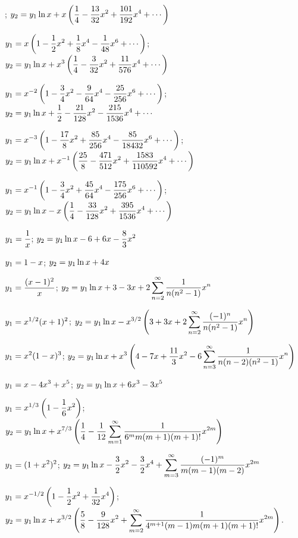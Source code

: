 \quad;\;  \;\;\;
$\displaystyle{y_{2}=y_{1}\ln
x+x\left(\frac{1}{4}-\frac{13}{32}x^{2}+\frac{101}{192}x^{4}
+\cdots\right)}$

$\displaystyle{y_{1}=x\left(1-\frac{1}{2}x^{2}+\frac{1}{8}x^{4}-\frac{1}{48}x^{6}+\cdots\right)}$;\;
$\displaystyle{y_{2}=y_{1}\ln x+x^{3}\left(\frac{1}{4}-\frac{3}{32}x^{2}+
\frac{11}{576}x^{4}+\cdots\right)}$

$\displaystyle{y_{1}=x^{-2}\left(1-\frac{3}{4}x^{2}-\frac{9}{64}x^{4}-\frac{25}{256}x^{6}
+\cdots\right)}$;\;
$\displaystyle{y_{2}=y_{1}\ln x+\frac{1}{2}-\frac{21}{128}x^{2}-\frac{215}{1536}x^{4}+\cdots}$

$\displaystyle{y_{1}=x^{-3}\left(1-\frac{17}{8}x^{2}+\frac{85}{256}x^{4}-\frac{85}{18432}x^{6}+\cdots\right)}$;\;
$\displaystyle{y_{2}=y_{1}\ln x
+x^{-1}\left(\frac{25}{8}-\frac{471}{512}x^{2}+\frac{1583}{110592}x^{4}
+\cdots\right)}$

$\displaystyle{y_{1}=x^{-1}\left(1-\frac{3}{4}x^{2}+\frac{45}{64}x^{4}-\frac{175}{256}x^{6}+\cdots
\right)}$;\;
$\displaystyle{y_{2}=y_{1}\ln x-x\left(\frac{1}{4}-\frac{33}{128}x^{2}+\frac{395}{1536}x^{4}
+\cdots\right)}$

$\displaystyle{y_{1}=\frac{1}{x}}$;\;   $\displaystyle{y_{2}=y_{1}\ln x-6+6x-\frac{8}{3}x^{2}}$

$\displaystyle{y_{1}=1-x}$;\;   $\displaystyle{y_{2}=y_{1}\ln x+4x}$

$\displaystyle{y_{1}=\frac{(x-1)^{2}}{x}}$;\;   $\displaystyle{y_{2}=y_{1}\ln x+3-3x+2\sum_{n=2}^{\infty}
\frac{1}{n(n^{2}-1)}x^{n}}$

$\displaystyle{y_{1}=x^{1/2}(x+1)^{2}}$;\;   $\displaystyle{y_{2}=y_{1}\ln x-x^{3/2}\left(
3+3x+2\sum_{n=2}^{\infty}\frac{(-1)^{n}}{n(n^{2}-1)}x^{n}\right)}$

$\displaystyle{y_{1}=x^{2}(1-x)^{3}}$;\;   $\displaystyle{y_{2}=y_{1}\ln
x+x^{3}\left(4-7x+\frac{11}{3}x^{2}-6\sum_{n=3}^{\infty}\frac{1}{n(n-2)(n^{2}-1)}x^{n}\right)}$

$\displaystyle{y_{1}=x-4x^{3}+x^{5}}$;\;   $\displaystyle{y_{2}=y_{1}\ln x+6x^{3}-3x^{5}}$

$\displaystyle{y_{1}=x^{1/3}\left(1-\frac{1}{6}x^{2}\right)}$;\;
 $\displaystyle{y_{2}=y_{1}\ln x
+x^{7/3}\left(\frac{1}{4}-\frac{1}{12}\sum_{m=1}^{\infty}
\frac{1}{6^{m}m(m+1)(m+1)!}x^{2m}\right)}$

$\displaystyle{y_{1}=(1+x^{2})^{2}}$;\;   $\displaystyle{y_{2}=y_{1}\ln x-\frac{3}{2}x^{2}-\frac{3}{2}x^{4}
+\sum_{m=3}^{\infty}\frac{(-1)^{m}}{m(m-1)(m-2)}x^{2m}}$

$\displaystyle{y_{1}=x^{-1/2}\left(1-\frac{1}{2}x^{2}+\frac{1}{32}x^{4}\right)}$;\;
$\displaystyle{y_{2}=y_{1}\ln x+x^{3/2}\left(\frac{5}{8}-\frac{9}{128}x^{2}
+\sum_{m=2}^{\infty}\frac{1}{4^{m+1}(m-1)m(m+1)(m+1)!}x^{2m}\right)}$.


